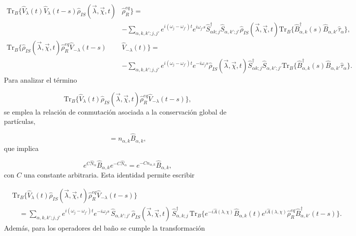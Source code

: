 \begin{appendixs}
\begin{align*} 
    \text{Tr}_{B}\{ \hat{V}_{\lambda}(t)\hat{V}_{\lambda}(t-s) \hat{\rho}_{IS}(\vec{\lambda},\vec{\chi},t)&\hat{\rho}^{eq}_{R} \} = \\ & - \sum_{\alpha,k,k';j,j'}e^{i(\omega_{j}-\omega_{j'})t}e^{i\omega_{j'}s}\hat{S}^{\dagger}_{\alpha k;j}\hat{S}_{\alpha,k';j'}\hat{\rho}_{IS}(\vec{\lambda},\vec{\chi},t)\text{Tr}_{B}\{\hat{B}^{\dagger}_{\alpha,k}(s)\hat{B}_{\alpha,k'}\hat{\tau}_{\alpha} \}, \\ \text{Tr}_{B}\{ \hat{\rho}_{IS}(\vec{\lambda},\vec{\chi},t)\hat{\rho}^{eq}_{R} \hat{V}_{-\lambda}(t-s)&\hat{V}_{-\lambda}(t) \} = \\ & - \sum_{\alpha,k,k';j,j'}e^{i(\omega_{j}-\omega_{j'})t}e^{-i\omega_{j}s}\hat{\rho}_{IS}(\vec{\lambda},\vec{\chi},t)\hat{S}^{\dagger}_{\alpha k;j}\hat{S}_{\alpha,k';j'} \text{Tr}_{B}\{ \hat{B}^{\dagger}_{\alpha,k}(s)\hat{B}_{\alpha,k'}\hat{\tau}_{\alpha} \}. 
\end{align*} 
Para analizar el término

\begin{equation*}
    \mathrm{Tr}_{B}\{ \hat{V}_{\lambda}(t)\hat{\rho}_{IS}(\vec{\lambda},\vec{\chi},t)\hat{\rho}_{R}^{eq}\hat{V}_{-\lambda}(t-s) \},
\end{equation*}
se emplea la relación de conmutación asociada a la conservación global de partículas,  

\begin{equation*}
    [\hat{B}_{\alpha,k},\hat{N}_{\alpha}] = n_{\alpha,k}\hat{B}_{\alpha,k},
\end{equation*}
que implica 

\begin{equation}
    e^{C\hat{N}_{\alpha}}\hat{B}_{\alpha,k}e^{-C\hat{N}_{\alpha}} = e^{-Cn_{\alpha,k}}\hat{B}_{\alpha,k}, 
    \label{apendix:conservationparticle}
\end{equation}
con $C$ una constante arbitraria. Esta identidad permite escribir

\begin{align*}
   & \mathrm{Tr}_{B}\{ \hat{V}_{\lambda}(t)\hat{\rho}_{IS}(\vec{\lambda},\vec{\chi},t)\hat{\rho}_{R}^{eq}\hat{V}_{-\lambda}(t-s) \} \\
   &\quad = \sum_{\alpha,k,k';j,j'} e^{i(\omega_{j}-\omega_{j'})t} e^{-i\omega_{j}s}\, 
   \hat{S}_{\alpha,k';j'}\, \hat{\rho}_{IS}(\vec{\lambda},\vec{\chi},t)\, \hat{S}^{\dagger}_{\alpha,k;j}\,
   \mathrm{Tr}_{B}\{e^{-i\hat{A}(\lambda,\chi)} \hat{B}_{\alpha,k}(t)e^{i\hat{A}(\lambda,\chi)}\hat{\rho}_{R}^{eq}\hat{B}^{\dagger}_{\alpha,k'}(t-s) \}.
\end{align*}
Además, para los operadores del baño se cumple la transformación


\end{appendixs}
